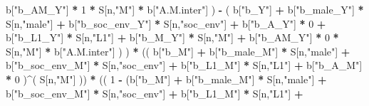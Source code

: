\documentclass[
]{book}
\newenvironment{Shaded}{\begin{snugshade}}{\end{snugshade}}
\newcommand{\DecValTok}[1]{\textcolor[rgb]{0.00,0.00,0.81}{#1}}
\newcommand{\NormalTok}[1]{#1}
\newcommand{\SpecialCharTok}[1]{\textcolor[rgb]{0.81,0.36,0.00}{\textbf{#1}}}
\newcommand{\StringTok}[1]{\textcolor[rgb]{0.31,0.60,0.02}{#1}}
\begin{document}
\begin{Shaded}
\begin{Highlighting}[]
\NormalTok{                            b[}\StringTok{"b\_AM\_Y"}\NormalTok{] }\SpecialCharTok{*} \DecValTok{1} \SpecialCharTok{*}\NormalTok{ S[n,}\StringTok{"M"}\NormalTok{] }\SpecialCharTok{*}\NormalTok{ b[}\StringTok{"A.M.inter"}\NormalTok{] ) }\SpecialCharTok{{-}} 
\NormalTok{                          ( b[}\StringTok{"b\_Y"}\NormalTok{] }\SpecialCharTok{+} 
\NormalTok{                              b[}\StringTok{"b\_male\_Y"}\NormalTok{] }\SpecialCharTok{*}\NormalTok{ S[n,}\StringTok{"male"}\NormalTok{] }\SpecialCharTok{+} 
\NormalTok{                              b[}\StringTok{"b\_soc\_env\_Y"}\NormalTok{] }\SpecialCharTok{*}\NormalTok{ S[n,}\StringTok{"soc\_env"}\NormalTok{] }\SpecialCharTok{+} 
\NormalTok{                              b[}\StringTok{"b\_A\_Y"}\NormalTok{] }\SpecialCharTok{*} \DecValTok{0} \SpecialCharTok{+} 
\NormalTok{                              b[}\StringTok{"b\_L1\_Y"}\NormalTok{] }\SpecialCharTok{*}\NormalTok{ S[n,}\StringTok{"L1"}\NormalTok{] }\SpecialCharTok{+}
\NormalTok{                              b[}\StringTok{"b\_M\_Y"}\NormalTok{] }\SpecialCharTok{*}\NormalTok{ S[n,}\StringTok{"M"}\NormalTok{] }\SpecialCharTok{+} 
\NormalTok{                              b[}\StringTok{"b\_AM\_Y"}\NormalTok{] }\SpecialCharTok{*} \DecValTok{0} \SpecialCharTok{*}\NormalTok{ S[n,}\StringTok{"M"}\NormalTok{] }\SpecialCharTok{*}\NormalTok{ b[}\StringTok{"A.M.inter"}\NormalTok{] ) ) }\SpecialCharTok{*}
\NormalTok{    (( b[}\StringTok{"b\_M"}\NormalTok{] }\SpecialCharTok{+} 
\NormalTok{         b[}\StringTok{"b\_male\_M"}\NormalTok{] }\SpecialCharTok{*}\NormalTok{ S[n,}\StringTok{"male"}\NormalTok{] }\SpecialCharTok{+} 
\NormalTok{         b[}\StringTok{"b\_soc\_env\_M"}\NormalTok{] }\SpecialCharTok{*}\NormalTok{ S[n,}\StringTok{"soc\_env"}\NormalTok{] }\SpecialCharTok{+} 
\NormalTok{         b[}\StringTok{"b\_L1\_M"}\NormalTok{] }\SpecialCharTok{*}\NormalTok{ S[n,}\StringTok{"L1"}\NormalTok{] }\SpecialCharTok{+}
\NormalTok{         b[}\StringTok{"b\_A\_M"}\NormalTok{] }\SpecialCharTok{*} \DecValTok{0}\NormalTok{ )}\SpecialCharTok{\^{}}\NormalTok{( S[n,}\StringTok{"M"}\NormalTok{] )) }\SpecialCharTok{*} 
\NormalTok{    (( }\DecValTok{1} \SpecialCharTok{{-}}\NormalTok{ (b[}\StringTok{"b\_M"}\NormalTok{] }\SpecialCharTok{+} 
\NormalTok{              b[}\StringTok{"b\_male\_M"}\NormalTok{] }\SpecialCharTok{*}\NormalTok{ S[n,}\StringTok{"male"}\NormalTok{] }\SpecialCharTok{+} 
\NormalTok{              b[}\StringTok{"b\_soc\_env\_M"}\NormalTok{] }\SpecialCharTok{*}\NormalTok{ S[n,}\StringTok{"soc\_env"}\NormalTok{] }\SpecialCharTok{+} 
\NormalTok{              b[}\StringTok{"b\_L1\_M"}\NormalTok{] }\SpecialCharTok{*}\NormalTok{ S[n,}\StringTok{"L1"}\NormalTok{] }\SpecialCharTok{+}

\end{Highlighting}
\end{Shaded}
\end{document}
